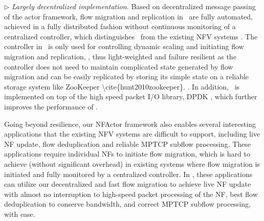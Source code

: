 

$\triangleright$ {\em Largely decentralized implementation.} Based on decentralized message passing of the actor framework, flow migration and replication in \nfactor~are fully automated, achieved in a fully distributed fashion without continuous monitoring of a centralized controller, which distinguishes \nfactor~from the existing NFV systems \cite{gember2015opennf}. The controller in \nfactor~is \ac{only used for controlling dynamic scaling and initiating flow migration and replication,} , thus light-weighted and failure resilient \ac{as the controller does not need to maintain complicated state generated by flow migration and can be easily replicated by storing its simple state on a reliable storage system like ZooKeeper \cite{hunt2010zookeeper}}. . In addition, \nfactor~is implemented on top of the high speed packet I/O library, DPDK \cite{dpdk}, which further improves the performance of \nfactor.



Going beyond resilience, our NFActor framework also enables several interesting applications that the existing NFV systems are difficult to support, including live NF update, flow deduplication and reliable MPTCP subflow processing. These applications require individual NFs to initiate flow migration, %
which is hard to achieve (without significant overhead) in existing systems where flow migration is initiated and fully monitored by a centralized controller. In \nfactor, these applications can utilize our decentralized and fast flow migration to achieve live NF update with almost no interruption to high-speed packet processing of the NF, best flow deduplication to conserve bandwidth, and correct MPTCP subflow processing, with ease. %

